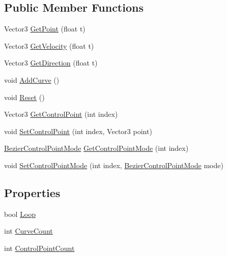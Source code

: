 \subsection*{Public Member Functions}
\begin{DoxyCompactItemize}
\item 
Vector3 \hyperlink{classBezierSpline_a4a9993e2dafa4a6b8819d94a25c70245}{Get\+Point} (float t)
\item 
Vector3 \hyperlink{classBezierSpline_a0d8c73af995773501fd3e5c4dac4c3b6}{Get\+Velocity} (float t)
\item 
Vector3 \hyperlink{classBezierSpline_a24c9b2087b16b650871a9ed2355987cc}{Get\+Direction} (float t)
\item 
void \hyperlink{classBezierSpline_a4676e1c6d2cfc8454c028e30d54783bd}{Add\+Curve} ()
\item 
void \hyperlink{classBezierSpline_a69c0d6f430f28fec72bffb8812861247}{Reset} ()
\item 
Vector3 \hyperlink{classBezierSpline_aee83e5e470e3d7d23f75875c81bbd326}{Get\+Control\+Point} (int index)
\item 
void \hyperlink{classBezierSpline_aed423df0d5f7c31a82a617ad8ebc23e4}{Set\+Control\+Point} (int index, Vector3 point)
\item 
\hyperlink{BezierControlPointMode_8cs_a41ff1a7271616f36cab397d937ee41b0}{Bezier\+Control\+Point\+Mode} \hyperlink{classBezierSpline_a1600b5bf35f1aa796e5fbe227b5a767d}{Get\+Control\+Point\+Mode} (int index)
\item 
void \hyperlink{classBezierSpline_a5c538c5216c5743de35ce9999760749c}{Set\+Control\+Point\+Mode} (int index, \hyperlink{BezierControlPointMode_8cs_a41ff1a7271616f36cab397d937ee41b0}{Bezier\+Control\+Point\+Mode} mode)
\end{DoxyCompactItemize}
\subsection*{Properties}
\begin{DoxyCompactItemize}
\item 
bool \hyperlink{classBezierSpline_a9b13fb8edeb86c6166fbd091b044eb63}{Loop}
\item 
int \hyperlink{classBezierSpline_a953275346ac1b490473e3500c06b6286}{Curve\+Count}
\item 
int \hyperlink{classBezierSpline_acb5b34c12c98bdf6b0ec0917009b1626}{Control\+Point\+Count}
\end{DoxyCompactItemize}
